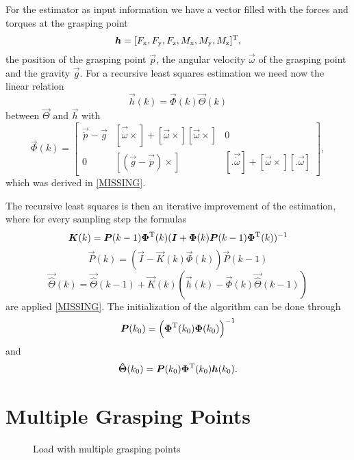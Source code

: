 For the estimator as input information we have a vector filled with the forces and torques at the grasping point
\begin{equation}
	\boldsymbol{h} = [F_{\mathrm{x}}, F_{\mathrm{y}}, F_{\mathrm{z}}, M_{\mathrm{x}}, M_{\mathrm{y}}, M_{\mathrm{z}}]^{\mathrm{T}},
\end{equation}
the position of the grasping point $\vec p$, the angular velocity $\vec \omega$ of the grasping point and the gravity $\vec g$. For a recursive least squares estimation we need now the linear relation
\begin{equation}
	\vec{h}(k) = \vec{\Phi}(k) \vec{\Theta}(k)
\end{equation}
between $\vec{\Theta}$ and $\vec{h}$ with
\begin{equation}
	\vec{\Phi}(k) = 
	\begin{bmatrix}
		\vec{\ddot p} - \vec{g}	& [\vec{\dot \omega} \times] + [\vec{\omega}\times] [\vec{\omega} \times]	& 0 \\
		0			& [(\vec{g} - \vec{\ddot p}) \times]									& [.  \vec{\dot \omega}] + [\vec{\omega} \times] [. \vec{\omega}]
	\end{bmatrix},
\end{equation}
which was derived in \ref{MISSING}.

The recursive least squares is then an iterative improvement of the estimation, where for every sampling step the formulas
\begin{equation}
	\boldsymbol{K}(k) = \boldsymbol{P}(k-1) \boldsymbol{\Phi}^{\mathrm{T}}(k) (\boldsymbol{I} + \boldsymbol{\Phi}(k) \boldsymbol{P}(k - 1) \boldsymbol{\Phi}^{\mathrm{T}}(k))^{-1}
\end{equation}
\begin{equation}
	\vec{P}(k) = (\vec{I} - \vec{K}(k) \vec{\Phi}(k)) \vec{P}(k - 1)
\end{equation}
\begin{equation}
	\vec{\hat \Theta}(k)=\vec{ \hat \Theta}(k - 1) + \vec{K}(k) (\vec{h}(k) - \vec{\Phi}(k) \vec{\hat \Theta}(k - 1))
\end{equation}
are applied \ref{MISSING}. The initialization of the algorithm can be done through
\begin{equation}
	\boldsymbol{P}(k_0) = \left( \boldsymbol{\Phi}^{\mathrm{T}}(k_0) \boldsymbol{\Phi}(k_0) \right)^{-1}
\end{equation}
and
\begin{equation}
	\boldsymbol{\hat \Theta} (k_0) = \boldsymbol{P}(k_0) \boldsymbol{\Phi}^{\mathrm{T}}(k_0) \boldsymbol{h}(k_0).
\end{equation}

\section{Multiple Grasping Points}

\begin{figure}
	\centering
	
	\caption{Load with multiple grasping points}
	\label{fig:load_multiple_grasping_points}
\end{figure}
